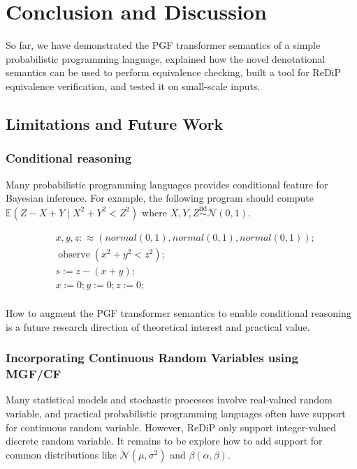 \documentclass[a4paper]{article}
\DeclareMathOperator*{\iid}{iid}
\newcommand{\E}{ \mathbb{E} }
\begin{document}
\section{Conclusion and Discussion}

So far, we have demonstrated the PGF transformer semantics of a simple probabilistic programming language,
explained how the novel denotational semantics can be used to perform equivalence checking,
built a tool for ReDiP equivalence verification,
and tested it on small-scale inputs.\par

\subsection{Limitations and Future Work}

\subsubsection{Conditional reasoning}
Many probabilistic programming languages provides conditional feature for Bayesian inference.
For example, the following program should compute \(\E(Z - X + Y\mid X^2+Y^2 < Z^2)\) where \(X,Y,Z\stackrel{\iid}{\sim}\mathcal{N}(0,1)\).

\begin{align*}
	 & x,y,z :\approx (normal(0,1),normal(0,1),normal(0,1)); \\
	 & \operatorname{observe}(x^2 + y^2 < z^2);              \\
	 & s := z - (x + y);                                     \\
	 & x := 0; y := 0; z := 0;                               \\
\end{align*}

How to augment the PGF transformer semantics to enable conditional reasoning is a future research direction of theoretical interest and practical value.

\subsubsection{Incorporating Continuous Random Variables using MGF/CF}
Many statistical models and stochastic processes involve real-valued random variable, and practical probabilistic programming languages often have support for continuous random variable.
However, ReDiP only support integer-valued discrete random variable.
It remains to be explore how to add support for common distributions like \(\mathcal{N}(\mu,\sigma^2)\) and \(\beta(\alpha,\beta)\).\par
\end{document}
